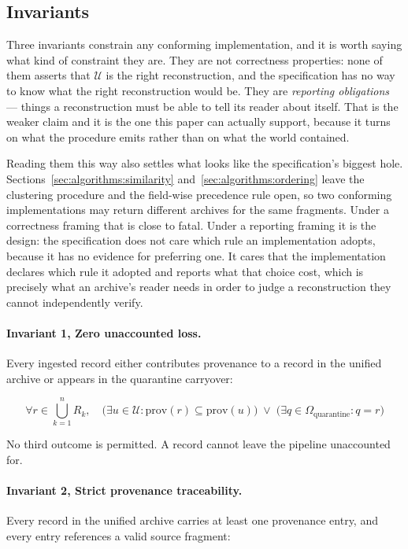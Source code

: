 \subsection{Invariants}
\label{sec:carta:invariants}

Three invariants constrain any conforming implementation, and it is worth saying
what kind of constraint they are. They are not correctness properties: none of
them asserts that $\mathcal{U}$ is the right reconstruction, and the
specification has no way to know what the right reconstruction would be. They are
\emph{reporting obligations} --- things a reconstruction must be able to tell its
reader about itself. That is the weaker claim and it is the one this paper can
actually support, because it turns on what the procedure emits rather than on
what the world contained.

Reading them this way also settles what looks like the specification's biggest
hole. Sections~\ref{sec:algorithms:similarity} and~\ref{sec:algorithms:ordering}
leave the clustering procedure and the field-wise precedence rule open, so two
conforming implementations may return different archives for the same fragments.
Under a correctness framing that is close to fatal. Under a reporting framing it
is the design: the specification does not care which rule an implementation
adopts, because it has no evidence for preferring one. It cares that the
implementation declares which rule it adopted and reports what that choice cost,
which is precisely what an archive's reader needs in order to judge a
reconstruction they cannot independently verify.

\paragraph{Invariant 1, Zero unaccounted loss.}
Every ingested record either contributes provenance to a record in the unified
archive or appears in the quarantine carryover:

\begin{equation}
  \forall r \in \bigcup_{k=1}^{n} R_k, \quad
  \big(\exists u \in \mathcal{U} : \mathrm{prov}(r) \subseteq \mathrm{prov}(u)\big)
  \;\lor\;
  \big(\exists q \in \Omega_{\text{quarantine}} : q = r\big)
  \label{eq:inv1}
\end{equation}

No third outcome is permitted. A record cannot leave the pipeline unaccounted for.

\paragraph{Invariant 2, Strict provenance traceability.}
Every record in the unified archive carries at least one provenance entry, and
every entry references a valid source fragment:

